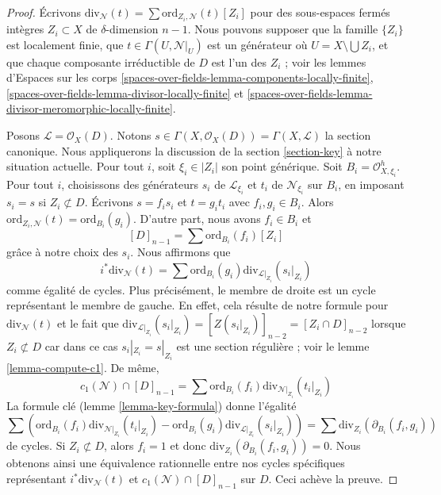 \begin{proof}
Écrivons $\text{div}_\mathcal{N}(t) = \sum \text{ord}_{Z_i,
\mathcal{N}}(t)[Z_i]$ pour des sous-espaces fermés intègres $Z_i \subset
X$ de $\delta$-dimension $n - 1$. Nous pouvons supposer que la famille $\{Z_i\}$
est localement finie, que $t \in \Gamma(U, \mathcal{N}|_U)$ est un générateur
où $U = X \setminus \bigcup Z_i$, et que chaque composante irréductible de $D$
est l'un des $Z_i$ ; voir les lemmes d'Espaces sur les corps
\ref{spaces-over-fields-lemma-components-locally-finite},
\ref{spaces-over-fields-lemma-divisor-locally-finite} et
\ref{spaces-over-fields-lemma-divisor-meromorphic-locally-finite}.

\medskip\noindent
Posons $\mathcal{L} = \mathcal{O}_X(D)$. Notons $s \in \Gamma(X,
\mathcal{O}_X(D)) = \Gamma(X, \mathcal{L})$ la section canonique. Nous
appliquerons la discussion de la section \ref{section-key} à notre situation
actuelle. Pour tout $i$, soit $\xi_i \in |Z_i|$ son point générique. Soit
$B_i = \mathcal{O}_{X, \xi_i}^h$. Pour tout $i$, choisissons des
générateurs $s_i$ de $\mathcal{L}_{\xi_i}$ et $t_i$ de $\mathcal{N}_{\xi_i}$
sur $B_i$, en imposant $s_i = s$ si
$Z_i \not \subset D$. Écrivons $s = f_i s_i$ et $t = g_i t_i$ avec $f_i, g_i
\in B_i$. Alors $\text{ord}_{Z_i, \mathcal{N}}(t) = \text{ord}_{B_i}(g_i)$.
D'autre part, nous avons $f_i \in B_i$ et
$$
[D]_{n - 1} = \sum \text{ord}_{B_i}(f_i)[Z_i]
$$
grâce à notre choix des $s_i$. Nous affirmons que
$$
i^*\text{div}_\mathcal{N}(t) =
\sum \text{ord}_{B_i}(g_i) \text{div}_{\mathcal{L}|_{Z_i}}(s_i|_{Z_i})
$$
comme égalité de cycles. Plus précisément, le membre de droite est un cycle
représentant le membre de gauche. En effet, cela résulte de notre formule
pour $\text{div}_\mathcal{N}(t)$ et le fait que
$\text{div}_{\mathcal{L}|_{Z_i}}(s_i|_{Z_i}) = [Z(s_i|_{Z_i})]_{n - 2} = [Z_i
\cap D]_{n - 2}$ lorsque $Z_i \not \subset D$ car dans ce cas $s_i|_{Z_i} =
s|_{Z_i}$ est une section régulière ; voir le lemme \ref{lemma-compute-c1}. De
même,
$$
c_1(\mathcal{N}) \cap [D]_{n - 1} =
\sum \text{ord}_{B_i}(f_i) \text{div}_{\mathcal{N}|_{Z_i}}(t_i|_{Z_i})
$$
La formule clé (lemme \ref{lemma-key-formula}) donne l'égalité
$$
\sum \left(
\text{ord}_{B_i}(f_i) \text{div}_{\mathcal{N}|_{Z_i}}(t_i|_{Z_i}) -
\text{ord}_{B_i}(g_i) \text{div}_{\mathcal{L}|_{Z_i}}(s_i|_{Z_i}) \right) =
\sum \text{div}_{Z_i}(\partial_{B_i}(f_i, g_i))
$$
de cycles. Si $Z_i \not \subset D$, alors $f_i = 1$ et donc
$\text{div}_{Z_i}(\partial_{B_i}(f_i, g_i)) = 0$. Nous obtenons ainsi une
équivalence rationnelle entre nos cycles spécifiques représentant
$i^*\text{div}_\mathcal{N}(t)$ et $c_1(\mathcal{N}) \cap [D]_{n - 1}$ sur $D$.
Ceci achève la preuve.
\end{proof}

